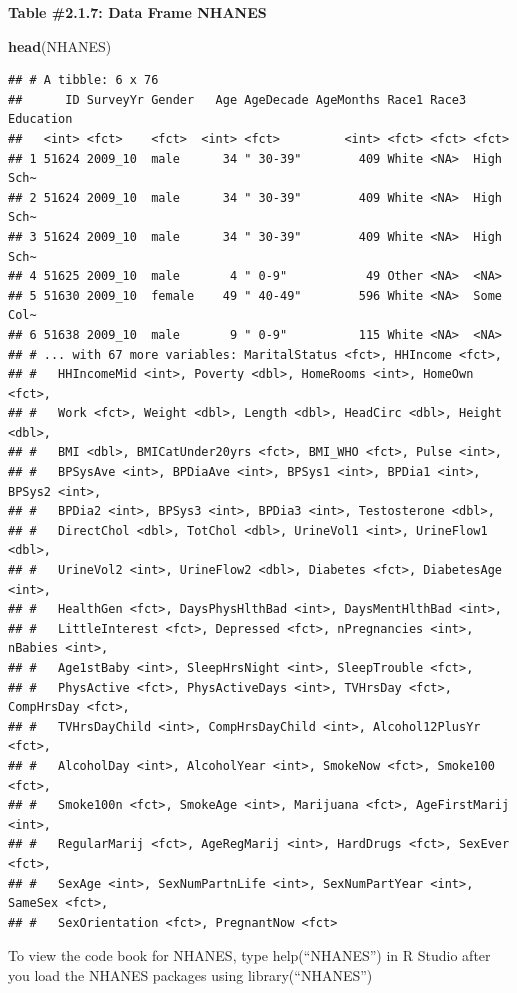 \documentclass[
]{book}
\newenvironment{Shaded}{\begin{snugshade}}{\end{snugshade}}
\newcommand{\KeywordTok}[1]{\textcolor[rgb]{0.13,0.29,0.53}{\textbf{#1}}}
\newcommand{\NormalTok}[1]{#1}
\begin{document}
\textbf{Table \#2.1.7: Data Frame NHANES}

\begin{Shaded}
\begin{Highlighting}[]
\KeywordTok{head}\NormalTok{(NHANES)}
\end{Highlighting}
\end{Shaded}

\begin{verbatim}
## # A tibble: 6 x 76
##      ID SurveyYr Gender   Age AgeDecade AgeMonths Race1 Race3 Education
##   <int> <fct>    <fct>  <int> <fct>         <int> <fct> <fct> <fct>    
## 1 51624 2009_10  male      34 " 30-39"        409 White <NA>  High Sch~
## 2 51624 2009_10  male      34 " 30-39"        409 White <NA>  High Sch~
## 3 51624 2009_10  male      34 " 30-39"        409 White <NA>  High Sch~
## 4 51625 2009_10  male       4 " 0-9"           49 Other <NA>  <NA>     
## 5 51630 2009_10  female    49 " 40-49"        596 White <NA>  Some Col~
## 6 51638 2009_10  male       9 " 0-9"          115 White <NA>  <NA>     
## # ... with 67 more variables: MaritalStatus <fct>, HHIncome <fct>,
## #   HHIncomeMid <int>, Poverty <dbl>, HomeRooms <int>, HomeOwn <fct>,
## #   Work <fct>, Weight <dbl>, Length <dbl>, HeadCirc <dbl>, Height <dbl>,
## #   BMI <dbl>, BMICatUnder20yrs <fct>, BMI_WHO <fct>, Pulse <int>,
## #   BPSysAve <int>, BPDiaAve <int>, BPSys1 <int>, BPDia1 <int>, BPSys2 <int>,
## #   BPDia2 <int>, BPSys3 <int>, BPDia3 <int>, Testosterone <dbl>,
## #   DirectChol <dbl>, TotChol <dbl>, UrineVol1 <int>, UrineFlow1 <dbl>,
## #   UrineVol2 <int>, UrineFlow2 <dbl>, Diabetes <fct>, DiabetesAge <int>,
## #   HealthGen <fct>, DaysPhysHlthBad <int>, DaysMentHlthBad <int>,
## #   LittleInterest <fct>, Depressed <fct>, nPregnancies <int>, nBabies <int>,
## #   Age1stBaby <int>, SleepHrsNight <int>, SleepTrouble <fct>,
## #   PhysActive <fct>, PhysActiveDays <int>, TVHrsDay <fct>, CompHrsDay <fct>,
## #   TVHrsDayChild <int>, CompHrsDayChild <int>, Alcohol12PlusYr <fct>,
## #   AlcoholDay <int>, AlcoholYear <int>, SmokeNow <fct>, Smoke100 <fct>,
## #   Smoke100n <fct>, SmokeAge <int>, Marijuana <fct>, AgeFirstMarij <int>,
## #   RegularMarij <fct>, AgeRegMarij <int>, HardDrugs <fct>, SexEver <fct>,
## #   SexAge <int>, SexNumPartnLife <int>, SexNumPartYear <int>, SameSex <fct>,
## #   SexOrientation <fct>, PregnantNow <fct>
\end{verbatim}

To view the code book for NHANES, type help(``NHANES'') in R Studio after you load the NHANES packages using library(``NHANES'')
\end{document}
